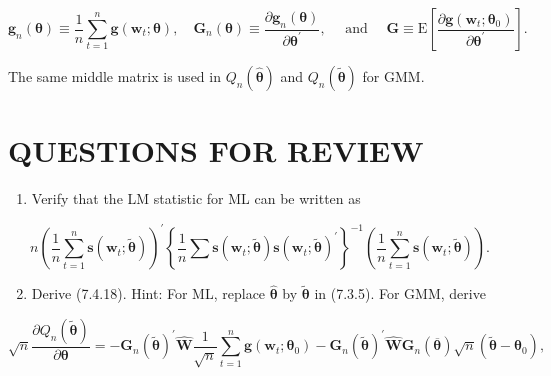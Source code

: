 \documentclass[10pt]{article}
\begin{document}
$$
\mathbf{g}_{n}(\boldsymbol{\theta}) \equiv \frac{1}{n} \sum_{t=1}^{n} \mathbf{g}\left(\mathbf{w}_{t} ; \boldsymbol{\theta}\right), \quad \mathbf{G}_{n}(\boldsymbol{\theta}) \equiv \frac{\partial \mathbf{g}_{n}(\boldsymbol{\theta})}{\partial \boldsymbol{\theta}^{\prime}}, \quad \text { and } \quad \mathbf{G} \equiv \mathrm{E}\left[\frac{\partial \mathbf{g}\left(\mathbf{w}_{t} ; \boldsymbol{\theta}_{0}\right)}{\partial \boldsymbol{\theta}^{\prime}}\right] .
$$

The same middle matrix is used in $Q_{n}(\hat{\boldsymbol{\theta}})$ and $Q_{n}(\tilde{\boldsymbol{\theta}})$ for GMM.

\section*{QUESTIONS FOR REVIEW}
\begin{enumerate}
  \item Verify that the LM statistic for ML can be written as
\end{enumerate}

$$
n\left(\frac{1}{n} \sum_{t=1}^{n} \mathbf{s}\left(\mathbf{w}_{t} ; \tilde{\boldsymbol{\theta}}\right)\right)^{\prime}\left\{\frac{1}{n} \sum \mathbf{s}\left(\mathbf{w}_{t} ; \tilde{\boldsymbol{\theta}}\right) \mathbf{s}\left(\mathbf{w}_{t} ; \tilde{\boldsymbol{\theta}}\right)^{\prime}\right\}^{-1}\left(\frac{1}{n} \sum_{t=1}^{n} \mathbf{s}\left(\mathbf{w}_{t} ; \tilde{\boldsymbol{\theta}}\right)\right) .
$$

\begin{enumerate}
  \setcounter{enumi}{1}
  \item Derive (7.4.18). Hint: For ML, replace $\hat{\boldsymbol{\theta}}$ by $\tilde{\boldsymbol{\theta}}$ in (7.3.5). For GMM, derive
\end{enumerate}

$$
\sqrt{n} \frac{\partial Q_{n}(\tilde{\boldsymbol{\theta}})}{\partial \boldsymbol{\theta}}=-\mathbf{G}_{n}(\tilde{\boldsymbol{\theta}})^{\prime} \widehat{\mathbf{W}} \frac{1}{\sqrt{n}} \sum_{t=1}^{n} \mathbf{g}\left(\mathbf{w}_{t} ; \boldsymbol{\theta}_{0}\right)-\mathbf{G}_{n}(\tilde{\boldsymbol{\theta}})^{\prime} \widehat{\mathbf{W}} \mathbf{G}_{n}(\overline{\boldsymbol{\theta}}) \sqrt{n}\left(\tilde{\boldsymbol{\theta}}-\boldsymbol{\theta}_{0}\right),
$$
\end{document}
